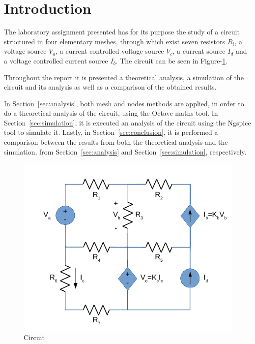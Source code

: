 \section{Introduction}
\label{sec:introduction}

The laboratory assignment presented has for its purpose the study of a circuit
structured in four elementary meshes, through which exist seven resistors $R_i$,
a voltage source $V_a$, a current controlled voltage source $V_c$, a current
source $I_d$ and a voltage controlled current source $I_b$. The circuit can
be seen in Figure-\ref{fig:circuit}.


Throughout the report it is presented a theoretical analysis, a simulation of the
circuit and its analysis as well as a comparison of the obtained results. \par
In Section~\ref{sec:analysis},  both mesh and nodes methods are applied, in order to do
a theoretical analysis of the circuit, using the Octave maths tool.
In Section~\ref{sec:simulation}, it is executed an analysis of the circuit using
the Ngspice tool to simulate it. Lastly, in Section~\ref{sec:conclusion}, it is
performed a comparison between the results from both the theoretical analysis
and the simulation, from Section~\ref{sec:analysis} and Section~\ref{sec:simulation},
respectively.


\begin{figure}[H] \centering
\includegraphics[width=0.7\linewidth]{circuit.pdf}
\caption{Circuit}
\label{fig:circuit}
\end{figure}

\newpage
